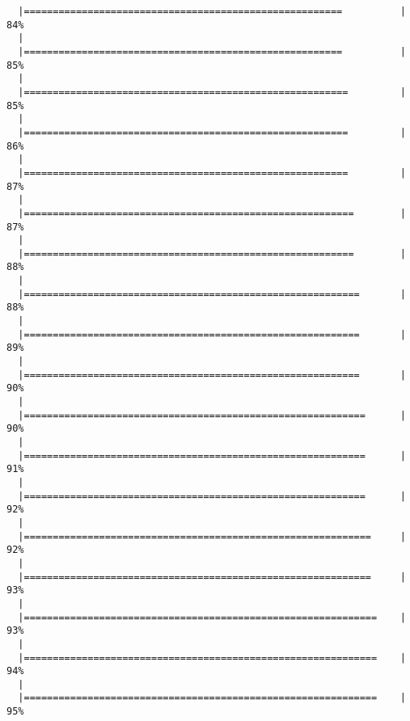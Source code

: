 \documentclass[]{article}
\begin{document}
\begin{verbatim}
  |=======================================================          |  84%
  |                                                                       
  |=======================================================          |  85%
  |                                                                       
  |========================================================         |  85%
  |                                                                       
  |========================================================         |  86%
  |                                                                       
  |========================================================         |  87%
  |                                                                       
  |=========================================================        |  87%
  |                                                                       
  |=========================================================        |  88%
  |                                                                       
  |==========================================================       |  88%
  |                                                                       
  |==========================================================       |  89%
  |                                                                       
  |==========================================================       |  90%
  |                                                                       
  |===========================================================      |  90%
  |                                                                       
  |===========================================================      |  91%
  |                                                                       
  |===========================================================      |  92%
  |                                                                       
  |============================================================     |  92%
  |                                                                       
  |============================================================     |  93%
  |                                                                       
  |=============================================================    |  93%
  |                                                                       
  |=============================================================    |  94%
  |                                                                       
  |=============================================================    |  95%

\end{verbatim}
\end{document}
